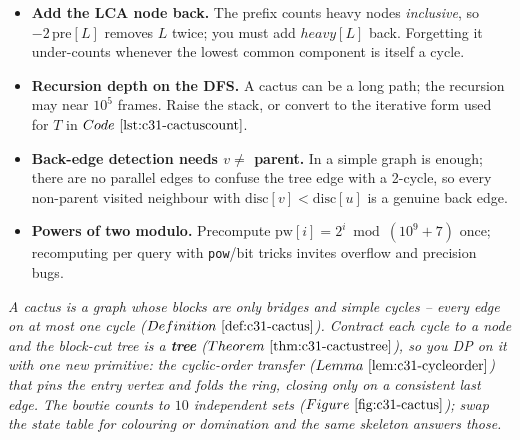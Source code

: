 \begin{hardeningbox}
\begin{itemize}[nosep,leftmargin=1.4em]
\item \textbf{Add the LCA node back.}  The prefix counts heavy nodes \emph{inclusive},
        so \(-2\,\mathrm{pre}[L]\) removes \(L\) twice; you must add
        \(\mathit{heavy}[L]\) back.  Forgetting it under-counts whenever the lowest
        common component is itself a cycle.
\item \textbf{Recursion depth on the DFS.}  A cactus can be a long path; the
         recursion may near \(10^{5}\) frames.  Raise the stack, or
        convert to the iterative form used for \(T\) in \(\coderef{c31-cactuscount}\).
\item \textbf{Back-edge detection needs \(v\ne\) parent.}  In a simple graph
         is enough; there are no parallel edges to confuse the
        tree edge with a 2-cycle, so every non-parent visited neighbour with
        \(\mathrm{disc}[v]<\mathrm{disc}[u]\) is a genuine back edge.
\item \textbf{Powers of two modulo.}  Precompute \(\mathrm{pw}[i]=2^{i}\bmod(10^{9}{+}7)\)
        once; recomputing per query with \texttt{pow}/bit tricks invites overflow and
        precision bugs.
\end{itemize}
\end{hardeningbox}

\begin{recallbox}
\emph{A cactus is a graph whose blocks are only bridges and simple cycles -- every edge
on at most one cycle (\(\defref{c31-cactus}\)).  Contract each cycle to a node and the
block-cut tree is a \textbf{tree} (\(\thmref{c31-cactustree}\)), so you DP on it with one
new primitive: the cyclic-order transfer  (\(\lemref{c31-cycleorder}\)) that
pins the entry vertex and folds the ring, closing only on a consistent last edge.  The
bowtie counts to \(10\) independent sets (\(\figref{c31-cactus}\)); swap the state table
for colouring or domination and the same skeleton answers those.}
\end{recallbox}
